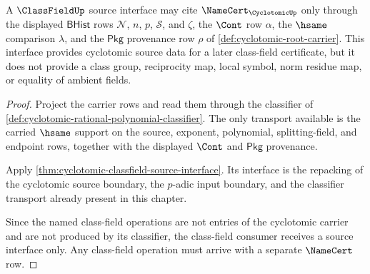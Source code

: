 \begin{theorem}
\label{thm:cyclotomic-classfield-source-obligation}
A $\ClassFieldUp$ source interface may cite $\NameCert_{\CyclotomicUp}$ only through the displayed $\mathsf{BHist}$ rows $\mathcal{N}$, $n$, $p$, $\mathcal{S}$, and $\zeta$, the $\Cont$ row $\alpha$, the $\hsame$ comparison $\lambda$, and the $\mathsf{Pkg}$ provenance row $\rho$ of \autoref{def:cyclotomic-root-carrier}. This interface provides cyclotomic source data for a later class-field certificate, but it does not provide a class group, reciprocity map, local symbol, norm residue map, or equality of ambient fields.
\end{theorem}
\begin{proof}
Project the carrier rows and read them through the classifier of \autoref{def:cyclotomic-rational-polynomial-classifier}. The only transport available is the carried $\hsame$ support on the source, exponent, polynomial, splitting-field, and endpoint rows, together with the displayed $\Cont$ and $\mathsf{Pkg}$ provenance.

Apply \autoref{thm:cyclotomic-classfield-source-interface}. Its interface is the repacking of the cyclotomic source boundary, the $p$-adic input boundary, and the classifier transport already present in this chapter.

Since the named class-field operations are not entries of the cyclotomic carrier and are not produced by its classifier, the class-field consumer receives a source interface only. Any class-field operation must arrive with a separate $\NameCert$ row.
\end{proof}

